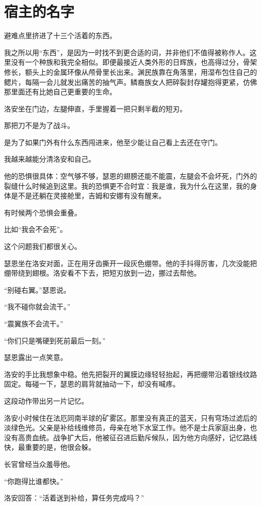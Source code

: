 \chapter{宿主的名字}

避难点里挤进了十三个活着的东西。

我之所以用“东西”，是因为一时找不到更合适的词，并非他们不值得被称作人。这里没有一个种族和我完全相似。即便最接近人类外形的日辉族，也高得过分，骨架修长，额头上的金属环像从颅骨里长出来。渊民族靠在角落里，用湿布包住自己的鳃片，每隔一会儿就发出痛苦的抽气声。鳞裔族女人把碎裂封存罐抱得更紧，仿佛那里面还有比她自己更重要的生命。

洛安坐在门边，左腿伸直，手里握着一把只剩半截的短刃。

那把刀不是为了战斗。

是为了如果门外有什么东西闯进来，他至少能让自己看上去还在守门。

我越来越能分清洛安和自己。

他的恐惧很具体：空气够不够，瑟恩的翅膀还能不能震，左腿会不会坏死，门外的裂缝什么时候追到这里。我的恐惧更不合时宜：我是谁，我为什么在这里，我的身体是不是还躺在灵接舱里，吉姆和安娜有没有醒来。

有时候两个恐惧会重叠。

比如“我会不会死”。

这个问题我们都很关心。

瑟恩坐在洛安对面，正在用牙齿撕开一段灰色绷带。他的手抖得厉害，几次没能把绷带绕到翅根。洛安看不下去，把短刃放到一边，挪过去帮他。

“别碰右翼。”瑟恩说。

“我不碰你就会流干。”

“震翼族不会流干。”

“你们只是嘴硬到死前最后一刻。”

瑟恩露出一点笑意。

洛安的手比我想象中稳。他先把裂开的翼膜边缘轻轻抬起，再把绷带沿着银线纹路固定。每碰一下，瑟恩的肩背就抽动一下，却没有喊疼。

这段动作带出另一片记忆。

洛安小时候住在法厄同南半球的矿雾区。那里没有真正的蓝天，只有穹场过滤后的淡绿色光。父亲是补给线维修员，母亲在地下水室工作。他不是士兵家庭出身，也没有高贵血统。战争扩大后，他被征召进后勤斥候队，因为他方向感好，记忆路线快，最重要的是，他很会躲。

长官曾经当众羞辱他。

“你跑得比谁都快。”

洛安回答：“活着送到补给，算任务完成吗？”

